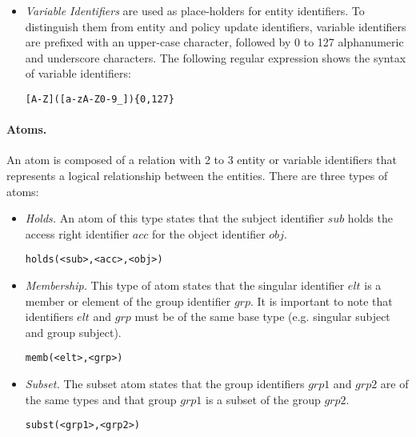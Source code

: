 \documentclass[glov2,twocolumn,final]{svjour2}
\newenvironment{vverbatim}
  {\begin{alltt}}
  {\vspace{-\baselineskip}\end{alltt}}
\begin{document}
\begin{itemize}
              \begin{vverbatim}
  [a-z]([a-zA-Z0-9\_])\{0,127\}
              \end{vverbatim}

            \item
              {\em Variable Identifiers} are used as place-holders for entity
              identifiers. To distinguish them from entity and policy update
              identifiers, variable identifiers are prefixed with an upper-case
              character, followed by 0 to 127 alphanumeric and underscore
              characters. The following regular expression shows the syntax of
              variable identifiers:

              \begin{vverbatim}
  [A-Z]([a-zA-Z0-9\_])\{0,127\}
              \end{vverbatim}
          \end{itemize}

        \paragraph{Atoms.}
          An atom is composed of a relation with 2 to 3 entity or variable
          identifiers that represents a logical relationship between the
          entities. There are three types of atoms:

          \begin{itemize}
            \item
              {\em Holds.} An atom of this type states that the subject
              identifier $sub$ holds the access right identifier $acc$
              for the object identifier $obj$.

              \begin{vverbatim}
  holds(<sub>, <acc>, <obj>)
              \end{vverbatim}
            \item
              {\em Membership.} This type of atom states that the singular
              identifier $elt$ is a member or element of the group identifier
              $grp$. It is important to note that identifiers $elt$ and $grp$
              must be of the same base type (e.g. singular subject and group
              subject).

              \begin{vverbatim}
  memb(<elt>, <grp>)
              \end{vverbatim}
            \item
              {\em Subset.} The subset atom states that the group identifiers
              $grp1$ and $grp2$ are of the same types and that group $grp1$ is
              a subset of the group $grp2$.

              \begin{vverbatim}
  subst(<grp1>, <grp2>)
              \end{vverbatim}
          \end{itemize}
\end{document}
